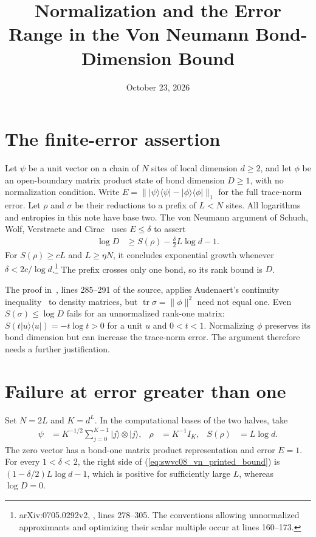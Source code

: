 \documentclass{article}
\title{Normalization and the Error Range in the\newline
Von Neumann Bond-Dimension Bound}
\author{}
\date{October 23, 2026}
\begin{document}
\maketitle
{}

\section{The finite-error assertion}

Let $\psi$ be a unit vector on a chain of $N$ sites of local dimension
$d\ge2$, and let $\phi$ be an open-boundary matrix product state of bond
dimension $D\ge1$, with no normalization condition. Write
$E=\lVert|\psi\rangle\langle\psi|-|\phi\rangle\langle\phi|\rVert_1$ for
the full trace-norm error. Let $\rho$ and $\sigma$ be their reductions to a
prefix of $L<N$ sites. All logarithms and entropies in this note have base two.
The von Neumann argument of Schuch, Wolf, Verstraete and
Cirac~\cite{Schuch2008EntropyScaling} uses $E\le\delta$ to assert
\begin{align}
    \log D & \ge S(\rho)-\frac{\delta}{2}L\log d-1.
    \label{eq:swvc08_vn_printed_bound}
\end{align}
For $S(\rho)\ge cL$ and $L\ge\eta N$, it concludes exponential growth
whenever $\delta<2c/\log d$.\footnote{arXiv:0705.0292v2,
    , lines 278--305. The conventions allowing unnormalized
    approximants and optimizing their scalar multiple occur at lines 160--173.}
The prefix crosses only one bond, so its rank bound is $D$.

The proof in~\cite{Schuch2008EntropyScaling}, lines 285--291 of the source,
applies Audenaert's continuity inequality~\cite{Audenaert2007Sharp} to
density matrices,
but $\operatorname{tr}\sigma=\lVert\phi\rVert^2$ need not equal one.
Even $S(\sigma)\le\log D$ fails for an unnormalized rank-one matrix:
$S(t|u\rangle\langle u|)=-t\log t>0$ for a unit $u$ and $0<t<1$.
Normalizing $\phi$ preserves its bond dimension but can increase the
trace-norm error. The argument therefore needs a further justification.

\section{Failure at error greater than one}

Set $N=2L$ and $K=d^L$. In the computational bases of the two halves, take
\begin{align}
    \psi & =K^{-1/2}\sum_{j=0}^{K-1}|j\rangle\otimes|j\rangle,
         & \rho                                                & =K^{-1}I_K,
         & S(\rho)                                             & =L\log d.
    \label{eq:swvc08_vn_maximal_prefix}
\end{align}
The zero vector has a bond-one matrix product representation and error
$E=1$. For every $1<\delta<2$, the right side of
(\ref{eq:swvc08_vn_printed_bound}) is
$(1-\delta/2)L\log d-1$, which is positive for sufficiently large $L$,
whereas $\log D=0$.
\end{document}
